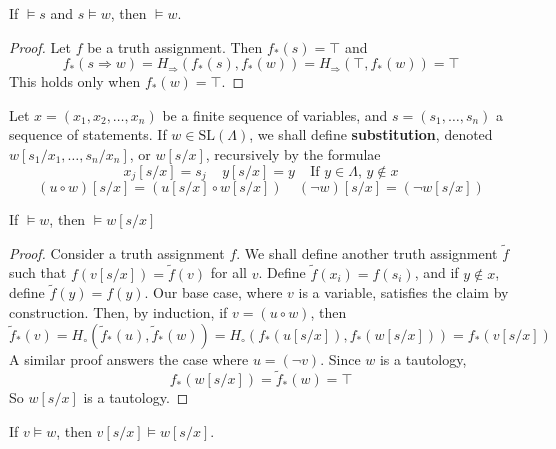 \begin{theorem}
    If $\vDash s$ and $s \vDash w$, then $\vDash w$.
\end{theorem}
\begin{proof}
    Let $f$ be a truth assignment. Then $f_*(s) = \top$ and
    \[ f_*(s \Rightarrow w) = H_\Rightarrow(f_*(s),f_*(w)) = H_\Rightarrow(\top, f_*(w)) = \top \]
    This holds only when $f_*(w) = \top$.
\end{proof}

\begin{definition}
    Let $x = (x_1, x_2, \dots, x_n)$ be a finite sequence of variables, and $s = (s_1, \dots, s_n)$ a sequence of statements. If $w \in \text{SL}(\Lambda)$, we shall define {\bf substitution}, denoted $w[s_1/x_1, \dots, s_n/x_n]$, or $w[s/x]$, recursively by the formulae
    \[ x_j[s/x] = s_j\ \ \ \ \ y [s/x] = y\ \ \ \ \  \text{If $y \in \Lambda$, $y \not \in x$} \]
    \[ (u \circ w)[s/x] = (u[s/x] \circ w[s/x])\ \ \ \ \ (\neg w)[s/x] = (\neg w[s/x]) \]
\end{definition}

\begin{theorem}
    If $\vDash w$, then $\vDash w[s/x]$
\end{theorem}
\begin{proof}
    Consider a truth assignment $f$. We shall define another truth assignment $\tilde{f}$ such that $f(v[s/x]) = \tilde{f}(v)$ for all $v$. Define $\tilde{f}(x_i) = f(s_i)$, and if $y \not \in x$, define $\tilde{f}(y) = f(y)$. Our base case, where $v$ is a variable, satisfies the claim by construction. Then, by induction, if $v = (u \circ w)$, then
    \[ \tilde{f}_*(v) = H_\circ(\tilde{f}_*(u), \tilde{f}_*(w)) = H_\circ(f_*(u[s/x]), f_*(w[s/x])) = f_*(v[s/x]) \]
    A similar proof answers the case where $u = (\neg v)$. Since $w$ is a tautology,
    \[ f_*(w[s/x]) = \tilde{f}_*(w) = \top \]
    So $w[s/x]$ is a tautology.
\end{proof}

\begin{corollary}
    If $v \vDash w$, then $v[s/x] \vDash w[s/x]$.
\end{corollary}


